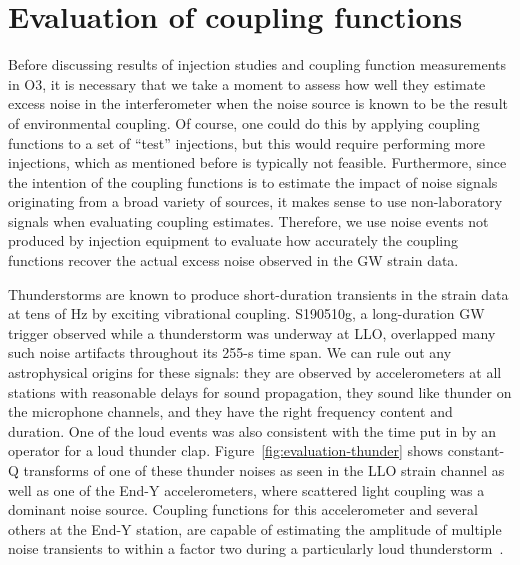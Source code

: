 \section{Evaluation of coupling functions}\label{sec:evaluation-of-cf}

Before discussing results of injection studies and coupling function measurements in \ac{O3}, it is necessary that we take a moment to assess how well they estimate excess noise in the interferometer when the noise source is known to be the result of environmental coupling.
Of course, one could do this by applying coupling functions to a set of ``test'' injections, but this would require performing more injections, which as mentioned before is typically not feasible.
Furthermore, since the intention of the coupling functions is to estimate the impact of noise signals originating from a broad variety of sources, it makes sense to use non-laboratory signals when evaluating coupling estimates.
Therefore, we use noise events not produced by injection equipment to evaluate how accurately the coupling functions recover the actual excess noise observed in the \ac{GW} strain data.

Thunderstorms are known to produce short-duration transients in the strain data at tens of Hz by exciting vibrational coupling.
S190510g, a long-duration GW trigger observed while a thunderstorm was underway at LLO, overlapped many such noise artifacts throughout its 255-s time span.
We can rule out any astrophysical origins for these signals: they are observed by accelerometers at all stations with reasonable delays for sound propagation, they sound like thunder on the microphone channels, and they have the right frequency content and duration. One of the loud events was also consistent with the time put in by an operator for a loud thunder clap.
Figure~\ref{fig:evaluation-thunder} shows constant-Q transforms of one of these thunder noises as seen in the LLO strain channel as well as one of the End-Y accelerometers, where scattered light coupling was a dominant noise source.
Coupling functions for this accelerometer and several others at the End-Y station, are capable of estimating the amplitude of multiple noise transients to within a factor two during a particularly loud thunderstorm~\citep{alog_thunder}.

